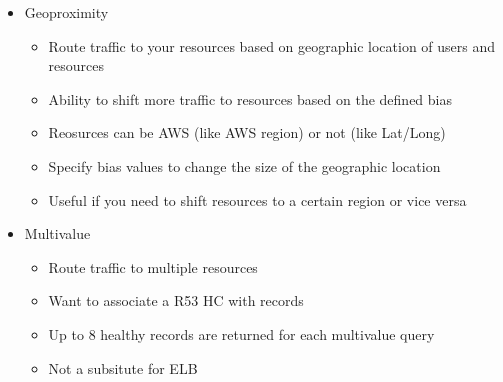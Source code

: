 \documentclass[]{scrartcl}
\begin{document}
\begin{itemize}
\begin{itemize}
	\end{itemize}
	\item Geoproximity
	\begin{itemize}
		\item Route traffic to your resources based on geographic location of users and resources
		\item Ability to shift more traffic to resources based on the defined bias
		\item Reosurces can be AWS (like AWS region) or not (like Lat/Long)
		\item Specify bias values to change the size of the geographic location
		\item Useful if you need to shift resources to a certain region or vice versa
	\end{itemize}
	\item Multivalue
	\begin{itemize}
		\item Route traffic to multiple resources
		\item Want to associate a R53 HC with records
		\item Up to 8 healthy records are returned for each multivalue query
		\item Not a subsitute for ELB
	\end{itemize}
\end{itemize}
\end{document}
